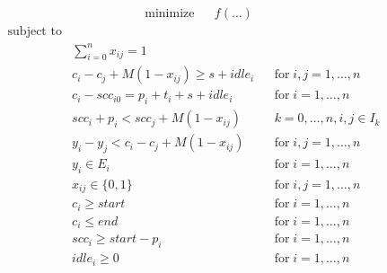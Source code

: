 \documentclass{ctuthesis}
\begin{document}
\begin{equation}
\begin{aligned}
&\text{minimize}
&&f(\ldots)
\end{aligned}
\end{equation}
\begin{equation}
\begin{aligned}
\text{subject to}\\
& \sum_{i=0}^{n} x_{ij} = 1 &&\\
& c_{i} - c_{j} + M(1 - x_{ij}) \geq s + idle_{i} && \text{for}\; i,j = 1, \ldots, n\\
& c_{i} - scc_{i0} = p_{i} + t_i + s + idle_i && \text{for}\; i = 1, \ldots, n\\
& scc_{i} + p_i < scc_j + M(1 - x_{ij}) && k = 0,\ldots,n, i,j \in I_k\\
& y_{i} - y_{j} < c_i - c_j + M(1 - x_{ij}) && \text{for}\; i,j = 1, \ldots, n\\
& y_i \in E_i && \text{for}\; i = 1, \ldots, n\\
& x_{ij} \in \{0, 1\}  && \text{for}\; i,j = 1, \ldots, n\\ 
& c_i \geq start && \text{for}\; i = 1, \ldots, n\\
& c_i \leq end && \text{for}\; i = 1, \ldots, n\\
& scc_{i} \geq start - p_i && \text{for}\; i = 1, \ldots, n\\
& idle_i \geq 0 && \text{for}\; i = 1, \ldots, n\\
\end{aligned}
\end{equation}
\\
\end{document}
